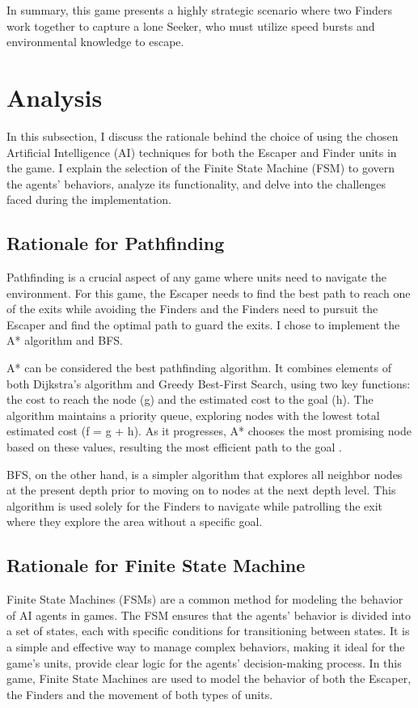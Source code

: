 \documentclass[a4paper,12pt]{article}
\begin{document}
In summary, this game presents a highly strategic scenario where two Finders work together to capture a lone Seeker, who must utilize speed bursts and environmental knowledge to escape.



\section{Analysis}
In this subsection, I discuss the rationale behind the choice of using the chosen Artificial Intelligence (AI) techniques for both the Escaper and Finder units in the game.
I explain the selection of the Finite State Machine (FSM) to govern the agents' behaviors, analyze its functionality, and delve into the challenges faced during the implementation.


\subsection{Rationale for Pathfinding}
Pathfinding is a crucial aspect of any game where units need to navigate the environment.
For this game, the Escaper needs to find the best path to reach one of the exits while avoiding the Finders and the Finders need to pursuit the Escaper and find the optimal path to guard the exits.
I chose to implement the A* algorithm and BFS.

A* can be considered the best pathfinding algorithm.
It combines elements of both Dijkstra's algorithm and Greedy Best-First Search, using two key functions: the cost to reach the node (g) and the estimated cost to the goal (h). 
The algorithm maintains a priority queue, exploring nodes with the lowest total estimated cost (f = g + h). 
As it progresses, A* chooses the most promising node based on these values, resulting the most efficient path to the goal \cite{article}.

BFS, on the other hand, is a simpler algorithm that explores all neighbor nodes at the present depth prior to moving on to nodes at the next depth level.
This algorithm is used solely for the Finders to navigate while patrolling the exit where they explore the area without a specific goal.


\subsection{Rationale for Finite State Machine}
Finite State Machines (FSMs) are a common method for modeling the behavior of AI agents in games.
The FSM ensures that the agents' behavior is divided into a set of states, each with specific conditions for transitioning between states.
It is a simple and effective way to manage complex behaviors, making it ideal for the game's units, provide clear logic for the agents' decision-making process.
In this game, Finite State Machines are used to model the behavior of both the Escaper, the Finders and the movement of both types of units.
\end{document}
